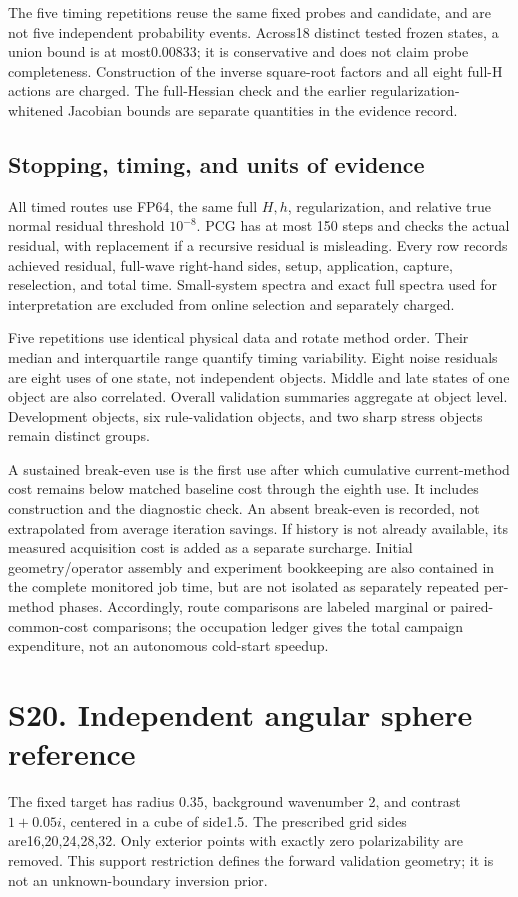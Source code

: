 The five timing repetitions reuse the same fixed probes and candidate, and are not five independent probability events. Across18 distinct tested frozen states, a union bound is at most0.00833; it is conservative and does not claim probe completeness. Construction of the inverse square-root factors and all eight full-H actions are charged. The full-Hessian check and the earlier regularization-whitened Jacobian bounds are separate quantities in the evidence record.

\subsection*{Stopping, timing, and units of evidence}
All timed routes use FP64, the same full $H,h$, regularization, and relative true normal residual threshold $10^{-8}$. PCG has at most 150 steps and checks the actual residual, with replacement if a recursive residual is misleading. Every row records achieved residual, full-wave right-hand sides, setup, application, capture, reselection, and total time. Small-system spectra and exact full spectra used for interpretation are excluded from online selection and separately charged.

Five repetitions use identical physical data and rotate method order. Their median and interquartile range quantify timing variability. Eight noise residuals are eight uses of one state, not independent objects. Middle and late states of one object are also correlated. Overall validation summaries aggregate at object level. Development objects, six rule-validation objects, and two sharp stress objects remain distinct groups.

A sustained break-even use is the first use after which cumulative current-method cost remains below matched baseline cost through the eighth use. It includes construction and the diagnostic check. An absent break-even is recorded, not extrapolated from average iteration savings. If history is not already available, its measured acquisition cost is added as a separate surcharge. Initial geometry/operator assembly and experiment bookkeeping are also contained in the complete monitored job time, but are not isolated as separately repeated per-method phases. Accordingly, route comparisons are labeled marginal or paired-common-cost comparisons; the occupation ledger gives the total campaign expenditure, not an autonomous cold-start speedup.



\section*{S20. Independent angular sphere reference}
The fixed target has radius 0.35, background wavenumber 2, and contrast $1+0.05i$, centered in a cube of side1.5. The prescribed grid sides are16,20,24,28,32. Only exterior points with exactly zero polarizability are removed. This support restriction defines the forward validation geometry; it is not an unknown-boundary inversion prior.

